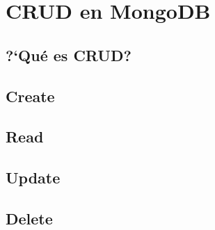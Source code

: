 \chapter{CRUD en MongoDB}

\section{?`Qu\'e es CRUD?}

\section{Create}

\section{Read}

\section{Update}

\section{Delete}